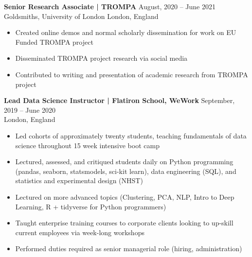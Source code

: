 











\iffalse
 \textbf{Senior Research Associate | TROMPA} \hfill  August, 2020 -- June 2021 \\ Goldsmiths, University of London
London, England \hfill 
\begin{itemize} \itemsep -2pt %
                        \item Created online demos and normal scholarly dissemination for work on EU Funded TROMPA project
                        \item Disseminated TROMPA project research via social media
                        \item Contributed to writing and presentation of academic research from TROMPA project
\end{itemize}
 
\textbf{Lead Data Science Instructor | Flatiron School, WeWork} \hfill  September, 2019 -- June 2020 \\
London, England \hfill 
\begin{itemize} \itemsep -2pt %
                        \item Led cohorts of approximately twenty students, teaching fundamentals of data science throughout 15 week intensive boot camp
                        \item Lectured, assessed, and critiqued students daily on Python programming (pandas, seaborn, statsmodels, sci-kit learn), data engineering (SQL), and statistics and experimental design (NHST)
                        \item Lectured on more advanced topics (Clustering, PCA, NLP, Intro to Deep Learning, R + tidyverse for Python programmers)
                        \item Taught enterprise training courses to corporate clients looking to up-skill current employees via week-long workshops 
                        \item Performed duties required as senior managerial role (hiring, administration) 
\end{itemize}

